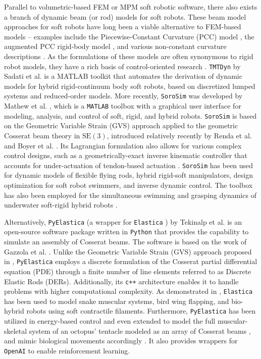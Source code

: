 Parallel to volumetric-based FEM or MPM soft robotic software, there also exists a branch of dynamic beam (or rod) models for soft robots. These beam model approaches for soft robots have long been a viable alternative to FEM-based models -- examples include the Piecewise-Constant Curvature (PCC) model \cite{Falkenhahn2015,Stolzle2021,Caasenbrood2022}, the augmented PCC rigid-body model \cite{DellaSantina2020,Trumic2020,Kazemipour2022May}, and various non-constant curvature descriptions \cite{DellaSantina2020,Wang2022Mar,Boyer2021,Renda2020}. As the formulations of these models are often synonymous to rigid robot models, they have a rich basis of control-oriented research \cite{Borja2022Apr,Pustina2022,Caasenbrood2022,Fischer2022}. \texttt{TMTDyn} by Sadati et al. \cite{Sadati2020} is a MATLAB toolkit that automates the derivation of dynamic models for hybrid rigid-continuum body soft robots, based on discretized lumped systems and reduced-order models. More recently, \texttt{SoroSim} was developed by Mathew et al. \cite{Mathew2022}, which is a \texttt{MATLAB} toolbox with a graphical user interface for modeling, analysis, and control of soft, rigid, and hybrid robots. \texttt{SoroSim} is based on the Geometric Variable Strain (GVS) approach applied to the geometric Cosserat beam theory in $\textrm{SE}(3)$, introduced relatively recently by Renda et al. \cite{Renda2020} and Boyer et al. \cite{Boyer2021}. Its Lagrangian formulation also allows for various complex control designs, such as a geometrically-exact inverse kinematic controller that accounts for under-actuation of tendon-based actuation \cite{Mathew2022}. \texttt{SoroSim} has been used for dynamic models of flexible flying rods, hybrid rigid-soft manipulators, design optimization for soft robot swimmers, and inverse dynamic control. The toolbox has also been employed for the simultaneous swimming and grasping dynamics of underwater soft-rigid hybrid robots \cite{Mathew2022Oct}.

Alternatively, \texttt{PyElastica} (a wrapper for \texttt{Elastica} \cite{Naughton2021}) by Tekinalp et al. \cite{Tekinalp2022} is an open-source software package written in \texttt{Python} that provides the capability to simulate an assembly of Cosserat beams. The software is based on the work of Gazzola et al. \cite{Gazzola2018}. Unlike the Geometric Variable Strain (GVS) approach proposed in \cite{Renda2020,Boyer2021,Mathew2022}, \texttt{PyElastica} employs a discrete formulation of the Cosserat partial differential equation (PDE) through a finite number of line elements referred to as Discrete Elastic Rods (DERs). Additionally, its \texttt{c++} architecture enables it to handle problems with higher computational complexity. As demonstrated in \cite{Zhang2019}, \texttt{Elastica} has been used to model snake muscular systems, bird wing flapping, and bio-hybrid robots using soft contractile filaments. Furthermore, \texttt{PyElastica} has been utilized in energy-based control and even extended to model the full muscular-skeletal system of an octopus' tentacle modeled as an array of Cosserat beams \cite{Chang2022}, and mimic biological movements accordingly \cite{Wang2022Dec}. It also provides wrappers for \texttt{OpenAI} to enable reinforcement learning.

